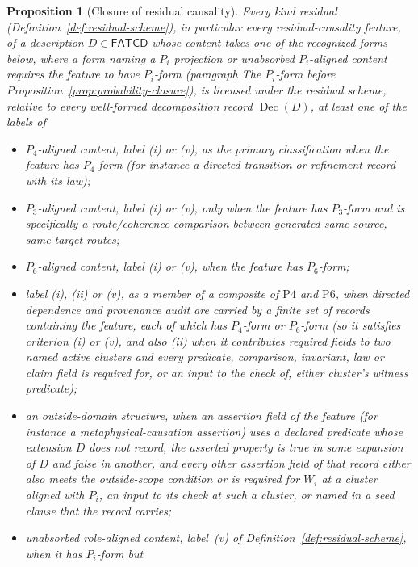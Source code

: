 \documentclass[11pt]{article}
\newtheorem{proposition}[theorem]{Proposition}
\theoremstyle{definition}
\newcommand{\FATCD}{\ensuremath{\mathsf{FATCD}}}
\newcommand{\Dec}[1]{\ensuremath{\operatorname{Dec}\!\left(#1\right)}}
\newcommand{\Pfour}{\ensuremath{\mathrm{P4}}}
\newcommand{\Psix}{\ensuremath{\mathrm{P6}}}
\begin{document}
\begin{proposition}[Closure of residual causality]\label{prop:causality-closure}
Every kind residual (Definition~\ref{def:residual-scheme}), in particular every residual-causality feature, of a description
\(D \in \FATCD{}\) whose content takes one of the recognized forms below,
where a form naming a \(P_i\) projection or unabsorbed \(P_i\)-aligned content
requires the feature to have \(P_i\)-form (paragraph \emph{The \(P_i\)-form}
before Proposition~\ref{prop:probability-closure}),
is licensed under the residual scheme, relative to every well-formed
decomposition record \(\Dec{D}\), at least one of the labels of
\begin{itemize}[topsep=2pt,itemsep=1pt]
  \item \(P_4\)-aligned content, label (i) or (v), as the primary classification when the
    feature has \(P_4\)-form (for instance a directed transition or
    refinement record with its law);
  \item \(P_3\)-aligned content, label (i) or (v), only when the feature has \(P_3\)-form and is specifically a
    route/coherence comparison between generated same-source,
    same-target routes;
  \item \(P_6\)-aligned content, label (i) or (v), when the feature has \(P_6\)-form;
  \item label (i), (ii) or (v), as a member of a composite of \Pfour{} and
    \Psix{}, when directed dependence and provenance audit are carried by a
    finite set of records containing the feature, each of which has
    \(P_4\)-form or \(P_6\)-form (so it satisfies criterion (i) or (v), and also (ii)
    when it contributes required fields to two named active clusters and every
    predicate, comparison, invariant, law or claim field is required for, or an
    input to the check of, either cluster's witness predicate);
  \item an outside-domain structure, when an assertion field of the feature (for instance a
    metaphysical-causation assertion) uses a declared predicate whose extension \(D\) does not record, the asserted property is true in some expansion of \(D\) and false in another, and every other assertion field of that record either also meets the outside-scope condition or is required for \(W_i\) at a cluster aligned with \(P_i\), an input to its check at such a cluster, or named in a seed clause that the record carries;
  \item unabsorbed role-aligned content, label~(v) of
    Definition~\ref{def:residual-scheme}, when it has \(P_i\)-form but

\end{itemize}
\end{proposition}
\end{document}
